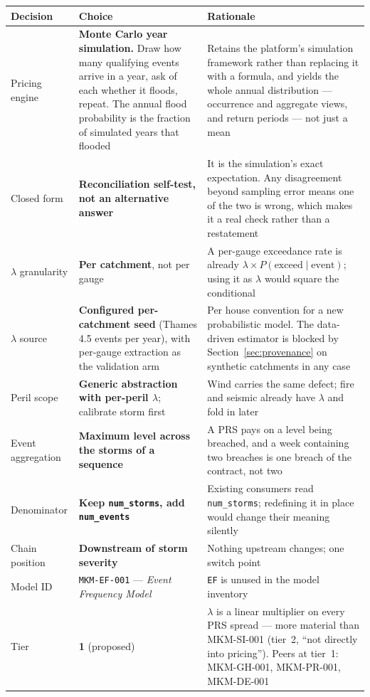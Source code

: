 \documentclass[11pt]{article}
\begin{document}
\begin{longtable}{@{}p{}p{}p{}@{}}
\toprule
\textbf{Decision} & \textbf{Choice} & \textbf{Rationale} \\
\midrule
\endhead
Pricing engine & \textbf{Monte Carlo year simulation.} Draw how many qualifying
events arrive in a year, ask of each whether it floods, repeat. The annual flood
probability is the fraction of simulated years that flooded & Retains the
platform's simulation framework rather than replacing it with a formula, and
yields the whole annual distribution --- occurrence and aggregate views, and
return periods --- not just a mean \\
\addlinespace
Closed form & \textbf{Reconciliation self-test, not an alternative answer} & It
is the simulation's exact expectation. Any disagreement beyond sampling error
means one of the two is wrong, which makes it a real check rather than a
restatement \\
\addlinespace
$\lambda$ granularity & \textbf{Per catchment}, not per gauge & A per-gauge
exceedance rate is already $\lambda \times P(\text{exceed} \mid \text{event})$;
using it as $\lambda$ would square the conditional \\
\addlinespace
$\lambda$ source & \textbf{Configured per-catchment seed} (Thames 4.5 events per
year), with per-gauge extraction as the validation arm & Per house convention
for a new probabilistic model. The data-driven estimator is blocked by
Section~\ref{sec:provenance} on synthetic catchments in any case \\
\addlinespace
Peril scope & \textbf{Generic abstraction with per-peril $\lambda$}; calibrate
storm first & Wind carries the same defect; fire and seismic already have
$\lambda$ and fold in later \\
\addlinespace
Event aggregation & \textbf{Maximum level across the storms of a sequence} & A
PRS pays on a level being breached, and a week containing two breaches is one
breach of the contract, not two \\
\addlinespace
Denominator & \textbf{Keep \texttt{num\_storms}, add \texttt{num\_events}} &
Existing consumers read \texttt{num\_storms}; redefining it in place would change
their meaning silently \\
\addlinespace
Chain position & \textbf{Downstream of storm severity} & Nothing upstream
changes; one switch point \\
\addlinespace
Model ID & \texttt{MKM-EF-001} --- \emph{Event Frequency Model} & \texttt{EF} is
unused in the model inventory \\
\addlinespace
Tier & \textbf{1} (proposed) & $\lambda$ is a linear multiplier on every PRS
spread --- more material than MKM-SI-001 (tier~2, ``not directly into
pricing''). Peers at tier~1: MKM-GH-001, MKM-PR-001, MKM-DE-001 \\
\bottomrule
\end{longtable}
\end{document}
